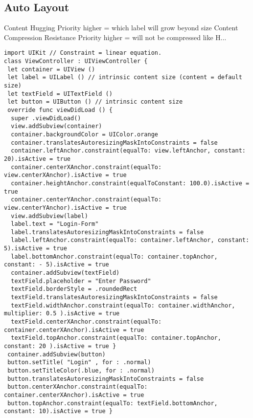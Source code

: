 \subsection{Auto Layout}
Content Hugging Priority higher = which label will grow beyond size
Content Compression Resistance Priority higher = will not be compressed like H...
\begin{lstlisting}
import UIKit // Constraint = linear equation.
class ViewController : UIViewController {
 let container = UIView ()
 let label = UILabel () // intrinsic content size (content = default size)
 let textField = UITextField ()
 let button = UIButton () // intrinsic content size
 override func viewDidLoad () {
  super .viewDidLoad()
  view.addSubview(container)
  container.backgroundColor = UIColor.orange
  container.translatesAutoresizingMaskIntoConstraints = false
  container.leftAnchor.constraint(equalTo: view.leftAnchor, constant: 20).isActive = true
  container.centerXAnchor.constraint(equalTo: view.centerXAnchor).isActive = true
  container.heightAnchor.constraint(equalToConstant: 100.0).isActive = true
  container.centerYAnchor.constraint(equalTo: view.centerYAnchor).isActive = true
  view.addSubview(label)
  label.text = "Login-Form"
  label.translatesAutoresizingMaskIntoConstraints = false
  label.leftAnchor.constraint(equalTo: container.leftAnchor, constant: 5).isActive = true
  label.bottomAnchor.constraint(equalTo: container.topAnchor, constant: - 5).isActive = true
  container.addSubview(textField)
  textField.placeholder = "Enter Password"
  textField.borderStyle = .roundedRect
  textField.translatesAutoresizingMaskIntoConstraints = false
  textField.widthAnchor.constraint(equalTo: container.widthAnchor, multiplier: 0.5 ).isActive = true
  textField.centerXAnchor.constraint(equalTo: container.centerXAnchor).isActive = true
  textField.topAnchor.constraint(equalTo: container.topAnchor, constant: 20 ).isActive = true }
 container.addSubview(button)
 button.setTitle( "Login" , for : .normal)
 button.setTitleColor(.blue, for : .normal)
 button.translatesAutoresizingMaskIntoConstraints = false
 button.centerXAnchor.constraint(equalTo: container.centerXAnchor).isActive = true
 button.topAnchor.constraint(equalTo: textField.bottomAnchor, constant: 10).isActive = true }
\end{lstlisting}


